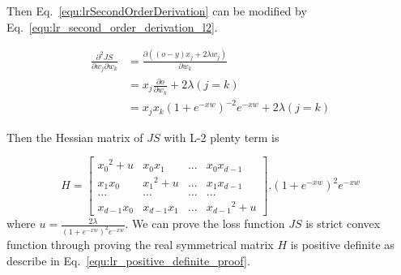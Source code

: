 \documentclass[runningheads,openany]{xhlPaper}
\begin{document}
Then Eq.~\ref{equ:lrSecondOrderDerivation} can be modified by Eq.~\ref{equ:lr_second_order_derivation_l2}.

\begin{equation}
\label{equ:lr_second_order_derivation_l2}
\begin{aligned}
\frac{{{\partial ^2}JS}}{{\partial {w_j}\partial {w_k}}} &= \frac{{\partial \left( {\left( {o - y} \right){x_j} + 2\lambda {w_j}} \right)}}{{\partial {w_k}}}\\
 &= {x_j}\frac{{\partial o}}{{\partial {w_k}}} + 2\lambda \left( {j = k} \right)\\
 &= {x_j}{x_k}{\left( {1 + {e^{ - xw}}} \right)^{ - 2}}{e^{ - xw}} + 2\lambda \left( {j = k} \right)
\end{aligned}
\end{equation} 

Then the Hessian matrix of $JS$ with L-2 plenty term is 

\begin{displaymath}
\label{equ:lr_hessian_matrix_loss_l2}
H = \left[ {\begin{array}{*{20}{c}}
{{x_0}^2 + u}&{{x_0}{x_1}}&{...}&{{x_0}{x_{d - 1}}}\\
{{x_1}{x_0}}&{{x_1}^2 + u}&{...}&{{x_1}{x_{d - 1}}}\\
{...}&{...}&{...}&{...}\\
{{x_{d - 1}}{x_0}}&{{x_{d - 1}}{x_1}}&{...}&{{x_{d - 1}}^2 + u}
\end{array}} \right].{\left( {1 + {e^{ - xw}}} \right)^2}{e^{ - xw}}
\end{displaymath}
where $u = \frac{{2\lambda }}{{{{\left( {1 + {e^{ - xw}}} \right)}^2}{e^{ - xw}}}}$. We can prove the loss function $JS$ is strict convex function through proving the real symmetrical matrix $H$ is positive definite as describe in Eq.~\ref{equ:lr_positive_definite_proof}.
\end{document}
